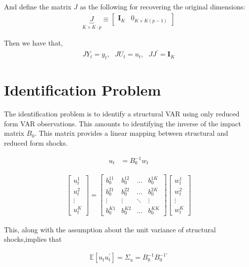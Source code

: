 \documentclass{article}
\newcommand*{\E}{\mathbb{E}}
\newcommand*{\I}{\mathbf{I}}
\begin{document}
And define the matrix $J$ as the following for recovering the original dimensions:
\begin{align*}
  \underbrace{J}_{K \times K\cdot p} \equiv \begin{bmatrix} \mathbf{I}_K & 0_{K \times K(p-1)} \end{bmatrix}
\end{align*}

Then we have that,
\begin{align*}
  J Y_t = y_t, \ \ \
  J U_t = u_t, \ \ \
  J J^\prime = \I_K
\end{align*}

\section{Identification Problem}

The identification problem is to identify a structural VAR using only reduced form VAR observations.
This amounts to identifying the inverse of the impact matrix $B_0$.
This matrix provides a linear mapping between structural and reduced form shocks.

\begin{align*}
  u_t &= B_0^{-1} w_t
\end{align*}

\begin{align*}
  \begin{bmatrix} u_t^1 \\ u_t^2 \\ \vdots \\ u_t^K \end{bmatrix}
  =
  \begin{bmatrix}
    b_0^{11} & b_0^{12} & \dots & b_0^{1K} \\
    b_0^{21} & b_0^{22} & \dots & b_0^{2K} \\
    \vdots & \vdots & \ddots & \vdots \\
    b_0^{K1} & b_0^{K2} & \dots & b_0^{KK}  \end{bmatrix}
  \begin{bmatrix} w_t^1 \\ w_t^2 \\ \vdots \\ w_t^K \end{bmatrix}
\end{align*}

This, along with the assumption about the unit variance of structural shocks,implies that

\begin{align*}
  \E[u_t u_t^\prime] = \Sigma_u = B_0^{-1} B_0^{-1\prime}
\end{align*}
\end{document}
